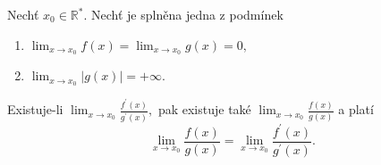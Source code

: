 \begin{veta}
Nechť $x_0\in \mathbb R^*$. Nechť je splněna jedna z podmínek
\begin{enumerate}[$i.$]
\item $\lim_{x\to x_0}f(x)=\lim_{x\to x_0}g(x)=0,$
\item $\lim_{x\to x_0}|g(x)| = +\infty.$
\end{enumerate}
Existuje-li $\lim_{x\to x_0}\frac{f^\prime (x)}{g^\prime (x)},$ pak existuje také
$\lim_{x\to x_0}\frac{f(x)}{g(x)}$ a platí
$$\lim_{x\to x_0}\frac{f(x)}{g(x)}=\lim_{x\to x_0}\frac{f^\prime (x)}{g^\prime(x)}.$$
\end{veta}
